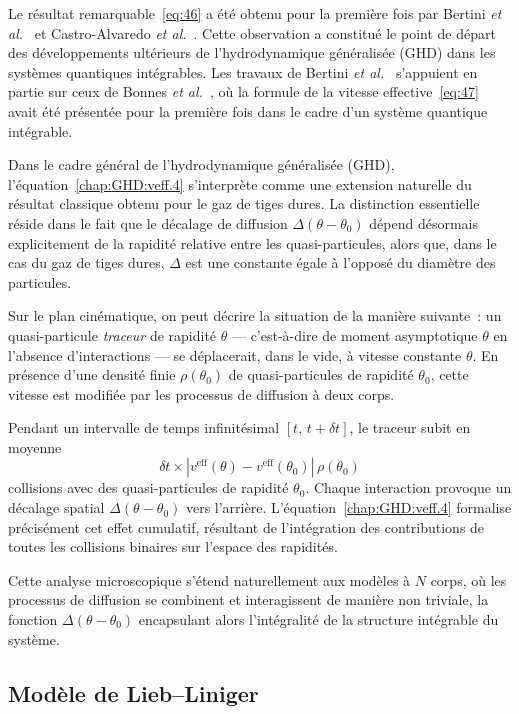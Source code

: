 Le résultat remarquable~\eqref{eq:46} a été obtenu pour la première fois par Bertini \emph{et al.}~\cite{Bertini2016} et Castro-Alvaredo \emph{et al.}~\cite{CastroAlvaredo2016}. Cette observation a constitué le point de départ des développements ultérieurs de l’hydrodynamique généralisée (GHD) dans les systèmes quantiques intégrables. Les travaux de Bertini \emph{et al.}~\cite{Bertini2016} s’appuient en partie sur ceux de Bonnes \emph{et al.}~\cite{Bonnes2014}, où la formule de la vitesse effective~\eqref{eq:47} avait été présentée pour la première fois dans le cadre d’un système quantique intégrable.

Dans le cadre général de l’hydrodynamique généralisée (GHD), l’équation~\eqref{chap:GHD:veff.4} s’interprète comme une extension naturelle du résultat classique obtenu pour le gaz de tiges dures. La distinction essentielle réside dans le fait que le décalage de diffusion \(\Delta(\theta - \theta_0)\) dépend désormais explicitement de la rapidité relative entre les quasi-particules, alors que, dans le cas du gaz de tiges dures, \(\Delta\) est une constante égale à l’opposé du diamètre des particules.

Sur le plan cinématique, on peut décrire la situation de la manière suivante~: un quasi-particule \emph{traceur} de rapidité \(\theta\) --- c’est-à-dire de moment asymptotique \(\theta\) en l’absence d’interactions --- se déplacerait, dans le vide, à vitesse constante \( \theta \). En présence d’une densité finie \(\rho(\theta_0)\) de quasi-particules de rapidité \(\theta_0\), cette vitesse est modifiée par les processus de diffusion à deux corps.

Pendant un intervalle de temps infinitésimal \([t,\, t + \delta t]\), le traceur subit en moyenne
\[
\delta t \times \left| v^{\mathrm{eff}}(\theta) - v^{\mathrm{eff}}(\theta_0) \right| \, \rho(\theta_0)
\]
collisions avec des quasi-particules de rapidité \(\theta_0\). Chaque interaction provoque un décalage spatial \(\Delta(\theta - \theta_0)\) vers l’arrière. L’équation~\eqref{chap:GHD:veff.4} formalise précisément cet effet cumulatif, résultant de l’intégration des contributions de toutes les collisions binaires sur l’espace des rapidités.

Cette analyse microscopique s’étend naturellement aux modèles à \(N\) corps, où les processus de diffusion se combinent et interagissent de manière non triviale, la fonction \(\Delta(\theta - \theta_0)\) encapsulant alors l’intégralité de la structure intégrable du système.

\subsection{Modèle de Lieb–Liniger}

